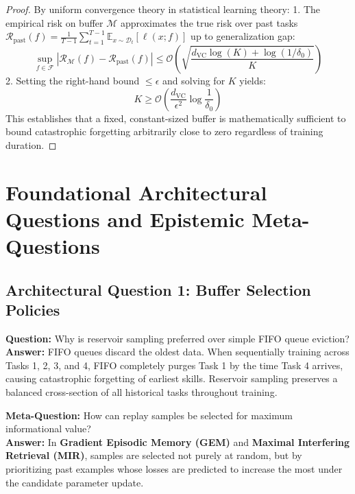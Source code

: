 \documentclass[11pt,a4paper]{article}
\theoremstyle{definition}
\begin{document}
\begin{proof}
By uniform convergence theory in statistical learning theory:
1. The empirical risk on buffer $\mathcal{M}$ approximates the true risk over past tasks $\mathcal{R}_{\text{past}}(f) = \frac{1}{T-1} \sum_{t=1}^{T-1} \mathbb{E}_{x \sim \mathcal{D}_t}[\ell(x; f)]$ up to generalization gap:
{\boldmath
\begin{equation}
\sup_{f \in \mathcal{F}} \left| \mathcal{R}_{\mathcal{M}}(f) - \mathcal{R}_{\text{past}}(f) \right| \le \mathcal{O}\left( \sqrt{\frac{d_{\text{VC}} \log(K) + \log(1/\delta_0)}{K}} \right)
\end{equation}
}
2. Setting the right-hand bound $\le \epsilon$ and solving for $K$ yields:
{\boldmath
\begin{equation}
K \ge \mathcal{O}\left( \frac{d_{\text{VC}}}{\epsilon^2} \log \frac{1}{\delta_0} \right)
\end{equation}
}
This establishes that a fixed, constant-sized buffer is mathematically sufficient to bound catastrophic forgetting arbitrarily close to zero regardless of training duration.
\end{proof}

\section{Foundational Architectural Questions and Epistemic Meta-Questions}

\subsection{Architectural Question 1: Buffer Selection Policies}
\textbf{Question:} Why is reservoir sampling preferred over simple FIFO queue eviction?\\
\textbf{Answer:} FIFO queues discard the oldest data. When sequentially training across Tasks 1, 2, 3, and 4, FIFO completely purges Task 1 by the time Task 4 arrives, causing catastrophic forgetting of earliest skills. Reservoir sampling preserves a balanced cross-section of all historical tasks throughout training.

\textbf{Meta-Question:} How can replay samples be selected for maximum informational value?\\
\textbf{Answer:} In \textbf{Gradient Episodic Memory (GEM)} and \textbf{Maximal Interfering Retrieval (MIR)}, samples are selected not purely at random, but by prioritizing past examples whose losses are predicted to increase the most under the candidate parameter update.
\end{document}

